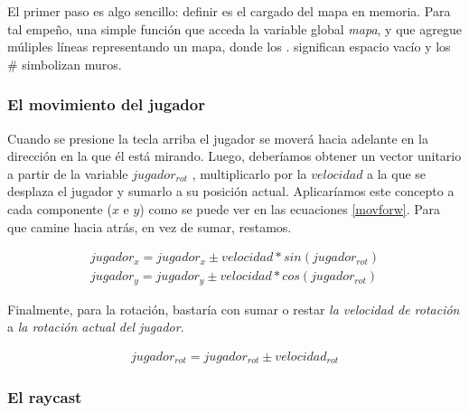 El primer paso es algo sencillo: definir es el cargado del mapa en memoria. Para tal empeño, una simple función que acceda la variable global \emph{mapa}, y que agregue múliples líneas representando un mapa, donde los $.$ significan espacio vacío y los $\#$  simbolizan muros.




\subsubsection{El movimiento del jugador}

Cuando se presione la tecla arriba el jugador se moverá hacia adelante en la dirección en la que él está mirando. Luego, deberíamos obtener un vector unitario a partir de la variable $jugador_{rot}$ , multiplicarlo por la $velocidad$ a la que se desplaza el jugador y sumarlo a su posición actual. Aplicaríamos este concepto a cada componente ($x$ e $y$) como se puede ver en las ecuaciones \ref{movforw}. Para que camine hacia atrás, en vez de sumar, restamos. 

\begin{equation}
\begin{aligned}
\label{movforw}
jugador_x = jugador_x \pm velocidad * sin(jugador_{rot})  \\
jugador_y = jugador_y \pm velocidad * cos(jugador_{rot})
\end{aligned}
\end{equation}

Finalmente, para la rotación, bastaría con sumar o restar \emph{la velocidad de rotación} a \emph{la rotación actual del jugador}.

\begin{equation}
\begin{aligned}
\label{eq-rot}
jugador_{rot} = jugador_{rot} \pm velocidad_{rot}
\end{aligned}
\end{equation}





\subsubsection{El raycast}

